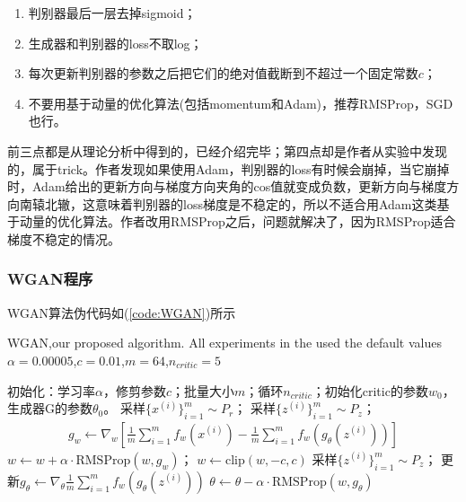             \begin{enumerate}
            \item 判别器最后一层去掉sigmoid；
            \item 生成器和判别器的loss不取log；
            \item 每次更新判别器的参数之后把它们的绝对值截断到不超过一个固定常数$c$；
            \item 不要用基于动量的优化算法(包括momentum和Adam)，推荐RMSProp，SGD也行。
            \end{enumerate}
            \par
            前三点都是从理论分析中得到的，已经介绍完毕；第四点却是作者从实验中发现的，属于trick。作者发现如果使用Adam，判别器的loss有时候会崩掉，当它崩掉时，Adam给出的更新方向与梯度方向夹角的cos值就变成负数，更新方向与梯度方向南辕北辙，这意味着判别器的loss梯度是不稳定的，所以不适合用Adam这类基于动量的优化算法。作者改用RMSProp之后，问题就解决了，因为RMSProp适合梯度不稳定的情况。
        \subsubsection{WGAN程序}
            \par
            WGAN算法伪代码如(\ref{code:WGAN})所示
            \begin{algorithm}[htbp]
                \caption{WGAN,our proposed algorithm. All experiments in the used the default values $\alpha = 0.00005$,$c=0.01$,$m=64$,$n_{critic}=5$}\label{code:WGAN}
                \begin{algorithmic}[1]
                    \State 初始化：学习率$\alpha$，修剪参数$c$；批量大小$m$；循环$n_{critic}$；初始化critic的参数$w_0$，生成器G的参数$\theta_0$。
                            \State 采样$\{x^{(i)}\}_{i=1}^m\sim P_r$；
                            \State 采样$\{z^{(i)}\}_{i=1}^m\sim P_z$；
                            \State
                            \begin{align*}
                            g_w \leftarrow \nabla_w \left[\frac{1}{m}\sum_{i=1}^m f_w(x^{(i)}) - \frac{1}{m}\sum_{i=1}^mf_w(g_\theta(z^{(i)}))\right]
                            \end{align*}
                            \State $w\leftarrow w+\alpha \cdot \mathrm{RMSProp}(w,g_w)$；
                            \State $w\leftarrow \mathrm{clip}(w,-c,c)$
                        \EndFor
                        \State 采样$\{z^{(i)}\}_{i=1}^m\sim P_z$；
                        \State 更新$g_\theta \leftarrow \nabla_\theta\frac{1}{m}\sum_{i=1}^mf_w(g_\theta(z^{(i)}))$
                        \State $\theta \leftarrow \theta - \alpha \cdot \mathrm{RMSProp}(w,g_\theta)$
                    \EndWhile
                \end{algorithmic}
            \end{algorithm}

